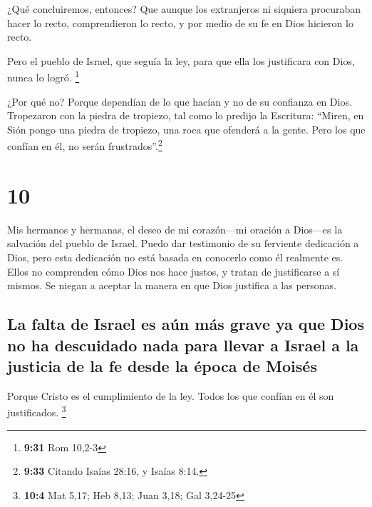  ¿Qué concluiremos, entonces? Que aunque los extranjeros
ni siquiera procuraban hacer lo recto, comprendieron lo recto, y por
medio de su fe en Dios hicieron lo recto.

 Pero el pueblo de Israel, que seguía la ley, para que
ella los justificara con Dios, nunca lo logró. \footnote{\textbf{9:31}
  Rom 10,2-3}

 ¿Por qué no? Porque dependían de lo que hacían y no de
su confianza en Dios. Tropezaron con la piedra de tropiezo,
 tal como lo predijo la Escritura: ``Miren, en Sión pongo
una piedra de tropiezo, una roca que ofenderá a la gente. Pero los que
confían en él, no serán frustrados''.\footnote{\textbf{9:33} Citando
  Isaías 28:16, y Isaías 8:14.}

\hypertarget{section-9}{%
\section{10}\label{section-9}}

 Mis hermanos y hermanas, el deseo de mi corazón---mi
oración a Dios---es la salvación del pueblo de Israel. 
Puedo dar testimonio de su ferviente dedicación a Dios, pero esta
dedicación no está basada en conocerlo como él realmente es.
 Ellos no comprenden cómo Dios nos hace justos, y tratan
de justificarse a sí mismos. Se niegan a aceptar la manera en que Dios
justifica a las personas.

\hypertarget{la-falta-de-israel-es-auxfan-muxe1s-grave-ya-que-dios-no-ha-descuidado-nada-para-llevar-a-israel-a-la-justicia-de-la-fe-desde-la-uxe9poca-de-moisuxe9s}{%
\subsection{La falta de Israel es aún más grave ya que Dios no ha
descuidado nada para llevar a Israel a la justicia de la fe desde la
época de
Moisés}\label{la-falta-de-israel-es-auxfan-muxe1s-grave-ya-que-dios-no-ha-descuidado-nada-para-llevar-a-israel-a-la-justicia-de-la-fe-desde-la-uxe9poca-de-moisuxe9s}}

 Porque Cristo es el cumplimiento de la ley. Todos los que
confían en él son justificados. \footnote{\textbf{10:4} Mat 5,17; Heb
  8,13; Juan 3,18; Gal 3,24-25}

